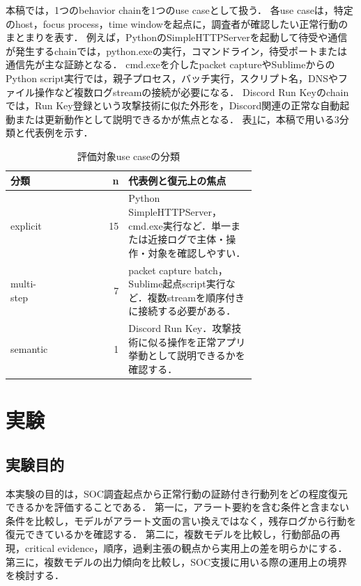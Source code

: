 \documentclass[a4paper,twocolumn,10pt]{article}
\newcommand{\code}[1]{{\small\ttfamily #1}}
\begin{document}
本稿では，1つのbehavior chainを1つのuse caseとして扱う．
各use caseは，特定のhost，focus process，time windowを起点に，調査者が確認したい正常行動のまとまりを表す．
例えば，PythonのSimpleHTTPServerを起動して待受や通信が発生するchainでは，\code{python.exe}の実行，コマンドライン，待受ポートまたは通信先が主な証跡となる．
cmd.exeを介したpacket captureやSublimeからのPython script実行では，親子プロセス，バッチ実行，スクリプト名，DNSやファイル操作など複数ログstreamの接続が必要になる．
Discord Run Keyのchainでは，Run Key登録という攻撃技術に似た外形を，Discord関連の正常な自動起動または更新動作として説明できるかが焦点となる．
表\ref{tab:usecase_type}に，本稿で用いる3分類と代表例を示す．

\begin{table}[t]
\centering
\footnotesize
\caption{評価対象use caseの分類}
\label{tab:usecase_type}
\setlength{\tabcolsep}{2pt}
\begin{tabular}{@{}p{0.18\linewidth}rp{0.52\linewidth}@{}}
\toprule
分類 & n & 代表例と復元上の焦点 \\
\midrule
explicit & 15 & Python SimpleHTTPServer，cmd.exe実行など．単一または近接ログで主体・操作・対象を確認しやすい．\\
multi-step & 7 & packet capture batch，Sublime起点script実行など．複数streamを順序付きに接続する必要がある．\\
semantic & 1 & Discord Run Key．攻撃技術に似る操作を正常アプリ挙動として説明できるかを確認する．\\
\bottomrule
\end{tabular}
\end{table}

\section{実験}

\subsection{実験目的}

本実験の目的は，SOC調査起点から正常行動の証跡付き行動列をどの程度復元できるかを評価することである．
第一に，アラート要約を含む条件と含まない条件を比較し，モデルがアラート文面の言い換えではなく，残存ログから行動を復元できているかを確認する．
第二に，複数モデルを比較し，行動部品の再現，critical evidence，順序，過剰主張の観点から実用上の差を明らかにする．
第三に，複数モデルの出力傾向を比較し，SOC支援に用いる際の運用上の境界を検討する．
\end{document}
